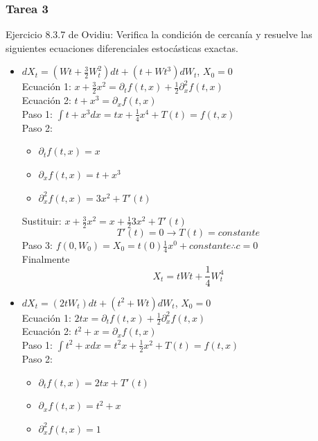 \documentclass[11pt,fleqn]{book} %
\numberwithin{equation}{section} %
\numberwithin{figure}{section} %
\numberwithin{table}{section} %
\begin{document}
\subsubsection{Tarea 3}
Ejercicio 8.3.7 de Ovidiu: Verifica la condición de cercanía y resuelve las siguientes ecuaciones diferenciales estocásticas exactas.
\begin{itemize}
    \item $dX_{t} = (W{t} + \frac{3}{2} W_{t}^{2})dt + (t + W{t}^{3})dW_{t}$, $X_{0} = 0$
    \ \\%
    Ecuación 1: $ x + \frac{3}{2} x^{2} = \partial_{t} f(t,x) + \frac{1}{2} \partial^{2}_{x} f(t,x)    $
    \ \\%
    Ecuación 2: $  t + x^{3}   = \partial_{x} f(t,x)   $
    \ \\%
    Paso 1: $ \int t + x^{3} dx = tx + \frac{1}{4} x^{4} + T(t)= f(t,x) $
    \ \\%
    Paso 2: 
    \begin{itemize}
        \item $ \partial_{t} f(t,x) =  x  $
        \item $ \partial_{x} f(t,x) = t + x^{3}  $
        \item $ \partial^{2}_{x} f(t,x) = 3x^{2} + T'(t)  $
    \end{itemize}
    Sustituir: $ x + \frac{3}{2} x^{2} = x + \frac{1}{2}3x^{2} + T'(t)    $
    $$ T'(t) = 0 \rightarrow T(t) = constante   $$
    Paso 3: $  f(0,W_{0}) = X_{0} =  t(0)  \frac{1}{4} x^{0} + constante       \therefore c= 0 $
    \ \\%
    Finalmente
    $$ X_{t} = tW{t} + \frac{1}{4}W_{t}^{4}  $$
    \item $dX_{t} = (2t W_{t})dt + (t^{2} + W{t})dW_{t}$, $X_{0} = 0$
    \ \\%
    Ecuación 1: $ 2tx    = \partial_{t} f(t,x) + \frac{1}{2} \partial^{2}_{x} f(t,x)    $
    \ \\%
    Ecuación 2: $  t^{2} + x   = \partial_{x} f(t,x)   $
    \ \\%
    Paso 1: $ \int t^{2} + x dx  = t^{2}x + \frac{1}{2} x^{2} + T(t) = f(t,x) $
    \ \\%
    Paso 2: 
    \begin{itemize}
        \item $ \partial_{t} f(t,x) = 2tx + T'(t)   $
        \item $ \partial_{x} f(t,x) = t^{2} + x  $
        \item $ \partial^{2}_{x} f(t,x) = 1  $
    \end{itemize}

\end{itemize}
\end{document}

